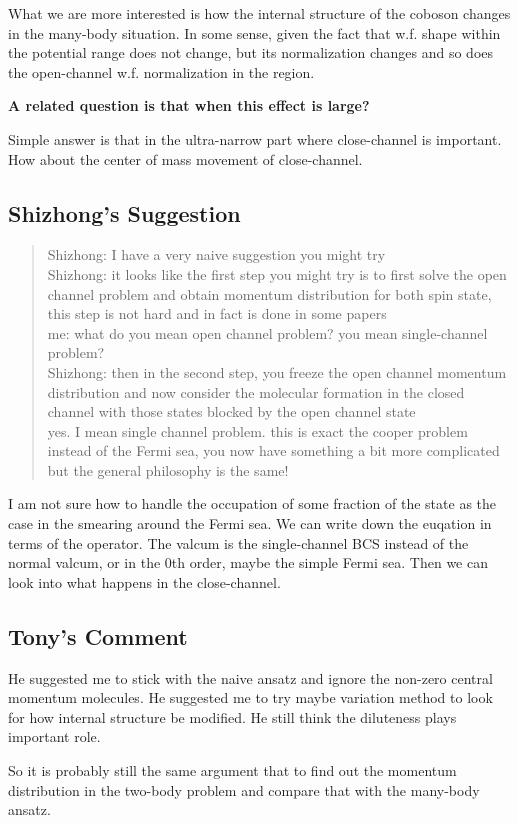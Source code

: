 What we are more interested is how the internal structure of the coboson changes in the many-body situation.  In some sense, given the fact that w.f. shape within the potential range does not change, but its normalization changes and so does the open-channel w.f. normalization in the region.  

\textbf{A related question is that when this effect is large?}

Simple answer is that in the ultra-narrow part where close-channel is important.  How about the center of mass movement of close-channel. 

\subsection{Shizhong's Suggestion}
\begin{quote}
Shizhong: I have a very naive suggestion you might try\\
Shizhong: it looks like the first step you might try is to first solve the open channel problem and obtain momentum distribution for both spin state, this step is not hard and in fact is done in some papers\\
 me: what do you mean open channel problem?
  you mean single-channel problem?\\
Shizhong: then in the second step, you freeze the open channel momentum distribution and now consider the molecular formation in the closed channel with those states blocked by the open channel state\\
  yes. I mean single channel problem.
  this is exact the cooper problem\\
 instead of the Fermi sea, you now have something a bit more complicated but the general philosophy is the same!
\end{quote}



I am not sure how to handle the occupation of some fraction of the state as the case in the smearing around the Fermi sea.  We can write down the euqation in terms of the operator.  The valcum is the single-channel BCS instead of the normal valcum, or in the 0th order, maybe the simple Fermi sea.  Then we can look into what happens in the close-channel.  

\subsection{Tony's Comment}
He suggested me to stick with the naive ansatz and ignore the non-zero central momentum molecules.  He suggested me to try maybe variation method to look for how internal structure be modified.  He still think the diluteness plays important role.

So it is probably still the same argument that to find out the momentum distribution in the two-body problem and compare that with the many-body ansatz.   
